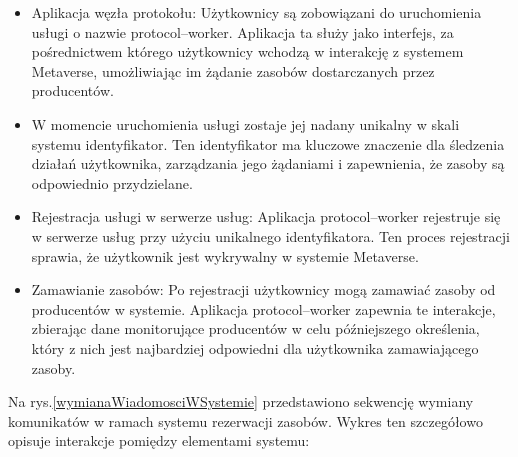 \begin{itemize}
    \item Aplikacja węzła protokołu: Użytkownicy są zobowiązani do uruchomienia usługi o nazwie protocol--worker. Aplikacja ta służy jako interfejs, za pośrednictwem którego użytkownicy wchodzą w interakcję z systemem Metaverse, umożliwiając im żądanie zasobów dostarczanych przez producentów.
    \item W momencie uruchomienia usługi zostaje jej nadany unikalny w skali systemu identyfikator. Ten identyfikator ma kluczowe znaczenie dla śledzenia działań użytkownika, zarządzania jego żądaniami i zapewnienia, że zasoby są odpowiednio przydzielane.
    \item Rejestracja usługi w serwerze usług: Aplikacja protocol--worker rejestruje się w serwerze usług przy użyciu unikalnego identyfikatora. Ten proces rejestracji sprawia, że użytkownik jest wykrywalny w systemie Metaverse.
    \item Zamawianie zasobów: Po rejestracji użytkownicy mogą zamawiać zasoby od producentów w systemie. Aplikacja protocol--worker zapewnia te interakcje, zbierając dane monitorujące producentów w celu późniejszego określenia, który z nich jest najbardziej odpowiedni dla użytkownika zamawiającego zasoby.
\end{itemize}

Na rys.\ref{wymianaWiadomosciWSystemie} przedstawiono sekwencję wymiany komunikatów w ramach systemu rezerwacji zasobów. Wykres ten szczegółowo opisuje interakcje pomiędzy elementami systemu:

